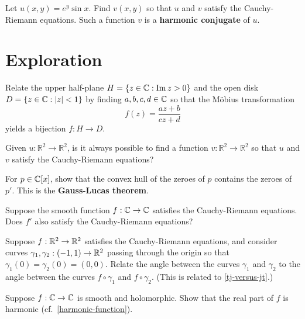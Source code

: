 \documentclass{homework}
\begin{document}
\begin{problem}\label{harmonic-conjugate}Let $u(x,y) = e^y \sin x$.  Find $v(x,y)$ so that $u$ and $v$
  satisfy the Cauchy-Riemann equations.  Such a function $v$ is a
  \textbf{harmonic conjugate} of $u$.
\end{problem}

\section{Exploration}

\begin{problem}\label{cayley-transform}Relate the upper half-plane
  $H = \{ z \in \mathbb{C} : \operatorname{Im} z > 0 \}$ and the open disk
  $D = \{ z \in \mathbb{C} : \left|z\right| < 1 \}$ by finding $a,b,c,d \in \mathbb{C}$ so that the M\"obius transformation
  \[f(z) = \frac{az + b}{cz + d}\] yields a bijection $f : H \to D$.
\end{problem}

\begin{problem}\label{harmonic-necessary}Given $u : \mathbb{R}^2 \to \mathbb{R}^2$, is it always possible to
  find a function $v : \mathbb{R}^2 \to \mathbb{R}^2$ so that $u$ and
  $v$ satisfy the Cauchy-Riemann equations?
\end{problem}

\begin{problem}
  For $p \in \mathbb{C}[x]$, show that the convex hull of the zeroes of $p$
  contains the zeroes of $p'$.  This is the \textbf{Gauss-Lucas
    theorem}.
\end{problem}

\begin{problem}
  Suppose the smooth function $f : \mathbb{C} \to \mathbb{C}$ satisfies the
  Cauchy-Riemann equations.  Does $f'$ also satisfy the Cauchy-Riemann
  equations?
\end{problem}

\begin{problem}
  Suppose $f : \mathbb{R}^2 \to \mathbb{R}^2$ satisfies the Cauchy-Riemann equations,
  and consider curves $\gamma_1, \gamma_2 : (-1,1) \to \mathbb{R}^2$ passing
  through the origin so that $\gamma_1(0) = \gamma_2(0) = (0,0)$.
  Relate the angle between the curves $\gamma_1$ and $\gamma_2$ to the
  angle between the curves $f \circ \gamma_1$ and $f \circ \gamma_2$.
  (This is related to \ref{tj-versus-jt}.)
\end{problem}

\begin{problem}
  Suppose $f : \mathbb{C} \to \mathbb{C}$ is smooth and holomorphic.  Show that the
  real part of $f$ is harmonic (cf.~\ref{harmonic-function}).
\end{problem}
\end{document}
